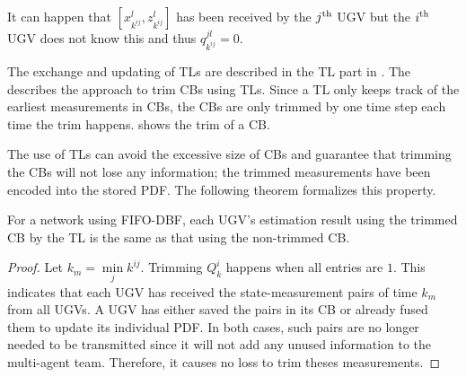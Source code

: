 	It can happen that $\left[x^l_{k^{ij}},z^l_{k^{ij}}\right]$ has been received by the $j^\text{th}$ UGV but the $i^\text{th}$ UGV does not know this and thus $q^{jl}_{k^{ij}}=0$.
	
	The exchange and updating of TLs are described in the TL part in .
	The  describes the approach to trim CBs using TLs.
	Since a TL only keeps track of the earliest measurements in CBs, the CBs are only trimmed by one time step each time the trim happens.
	 shows the trim of a CB.	
	
	The use of TLs can avoid the excessive size of CBs and guarantee that trimming the CBs will not lose any information; the trimmed measurements have been encoded into the stored PDF.
	The following theorem formalizes this property.
	
	\begin{thm}\label{thm:trim_no_loss}
		For a {\fc} network using FIFO-DBF, 
		each UGV's estimation result using the trimmed CB by the TL is the same as that using the non-trimmed CB.
	\end{thm}
	
	\begin{proof}
		
		Let $k_m=\min\limits_j k^{ij}$. 
		Trimming $Q^i_k$ happens when all entries are $1$. 
		This indicates that each UGV has received the state-measurement pairs of time $k_m$ from all UGVs.
		A UGV has either saved the pairs in its CB or already fused them to update its individual PDF.
		In both cases, such pairs are no longer needed to be transmitted since it will not add any unused information to the multi-agent team. 
		Therefore, it causes no loss to trim theses measurements.
	\end{proof}
	

